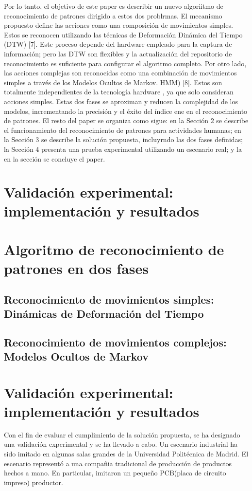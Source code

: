 \documentclass{article}
\begin{document}
Por lo tanto, el objetivo de este paper es describir un nuevo algoriitmo de reconocimiento de patrones dirigido a estos dos problrmas. El mecanismo propuesto define las acciones como una composición de movimientos simples. Estos se reconocen utilizando las técnicas de Deformación Dinámica del Tiempo (DTW) [7]. Este proceso depende del hardware empleado para la captura de información; pero las DTW son flexibles y la actualización del repositorio de reconocimiento es suficiente para configurar el algoritmo completo. Por otro lado, las acciones complejas son reconocidas como una combinación de movimientos simples a través de los Modelos Ocultos de Markov. HMM) [8]. Estos son totalmente independientes de la tecnología hardware , ya que solo consideran acciones simples. Estas dos fases  se aproximan y reducen la complejidad de los modelos, incrementando la precisión y el éxito del índice ene en el reconocimiento de patrones.
El resto del paper se organiza como sigue: en la Sección 2 se describe el funcionamiento del reconocimiento de patrones para actividades humanas; en la Sección 3 se describe la solución propuesta, incluyrndo las dos fases definidas; la Sección 4 presenta una prueba  experimental utilizando un escenario real; y la en la sección se concluye el paper.
\section {Validación experimental: implementación y resultados}
\section {Algoritmo de reconocimiento de patrones en dos fases}
\subsection{Reconocimiento de movimientos simples: Dinámicas de Deformación del Tiempo}
\subsection{Reconocimiento de movimientos complejos: Modelos Ocultos de Markov}
\section {Validación experimental: implementación y resultados}
Con el fin de evaluar el cumplimiento de la solución propuesta, se ha designado una validación experimental y se ha llevado a cabo. Un escenario industrial ha sido imitado en algunas salas grandes de la Universidad Politécnica de Madrid. El escenario representó a una compañia tradicional de producción de productos hechos a mano. En particular, imitaron un pequeño PCB(placa de circuito impreso) productor.
\end{document}
